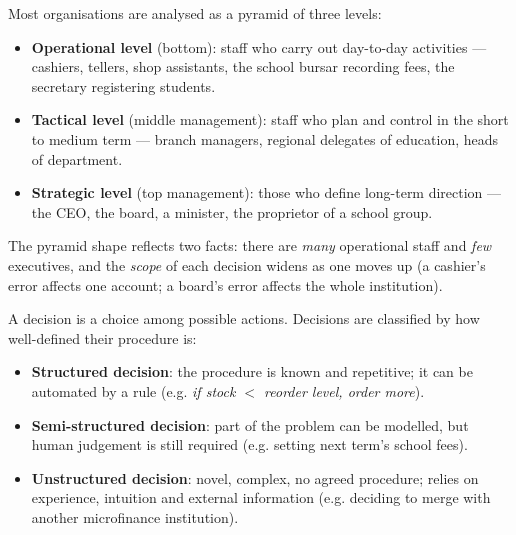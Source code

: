 \documentclass[11pt]{article}
\newcommand{\cle}[1]{{\popxbold\color{popdark}#1}}
\begin{document}
\begin{definition}
Most organisations are analysed as a pyramid of three \cle{levels}:
\begin{itemize}
\item \textbf{Operational level} (bottom): staff who carry out day-to-day activities --- cashiers, tellers, shop assistants, the school bursar recording fees, the secretary registering students.
\item \textbf{Tactical level} (middle management): staff who plan and control in the short to medium term --- branch managers, regional delegates of education, heads of department.
\item \textbf{Strategic level} (top management): those who define long-term direction --- the CEO, the board, a minister, the proprietor of a school group.
\end{itemize}
The pyramid shape reflects two facts: there are \emph{many} operational staff and \emph{few} executives, and the \emph{scope} of each decision widens as one moves up (a cashier's error affects one account; a board's error affects the whole institution).
\end{definition}

\begin{definition}
A \cle{decision} is a choice among possible actions. Decisions are classified by how well-defined their procedure is:
\begin{itemize}
\item \textbf{Structured decision}: the procedure is known and repetitive; it can be automated by a rule (e.g. \emph{if stock $<$ reorder level, order more}).
\item \textbf{Semi-structured decision}: part of the problem can be modelled, but human judgement is still required (e.g. setting next term's school fees).
\item \textbf{Unstructured decision}: novel, complex, no agreed procedure; relies on experience, intuition and external information (e.g. deciding to merge with another microfinance institution).
\end{itemize}
\end{definition}
\end{document}

